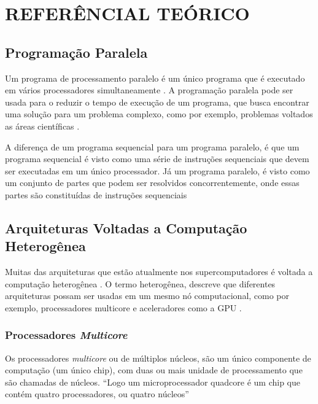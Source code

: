 
\chapter{REFERÊNCIAL TEÓRICO}
\label{chap:ref-teorico}

\section{Programação Paralela}

Um programa de processamento paralelo é um único programa que é executado em vários processadores simultaneamente \cite{hennessy2014organizaccao}. 
A programação paralela pode ser usada para o reduzir o tempo de execução de um programa,
que busca encontrar uma solução para um problema complexo, como por exemplo, problemas voltados as áreas científicas \cite{hennessy2014organizaccao}.

A diferença de um programa sequencial para um programa paralelo, é que um programa sequencial é visto como uma série de instruções
sequenciais que devem ser executadas em um único processador.
Já um programa paralelo, é visto como um conjunto de partes que podem ser resolvidos concorrentemente,
onde essas partes são constituídas de instruções sequenciais \cite{hennessy2014organizaccao,tanenbaum20103a}

\section{Arquiteturas Voltadas a Computação Heterogênea}
Muitas das arquiteturas que estão atualmente nos supercomputadores é voltada a computação heterogênea \cite{meuer2014top500}.
O termo heterogênea, descreve que diferentes arquiteturas possam ser usadas em um mesmo nó computacional, como por exemplo, processadores multicore e aceleradores como a GPU \cite{intrArqHete:2012}.

\subsection{Processadores \textit{Multicore}}
Os processadores \textit{multicore} ou de múltiplos núcleos, são um único componente de computação (um único chip), com duas ou mais unidade de processamento que são chamadas de núcleos. \cite{blake2009survey}
“Logo um microprocessador quadcore é um chip que contém quatro processadores, ou quatro núcleos” \cite[p.~31]{hennessy2014organizaccao}

